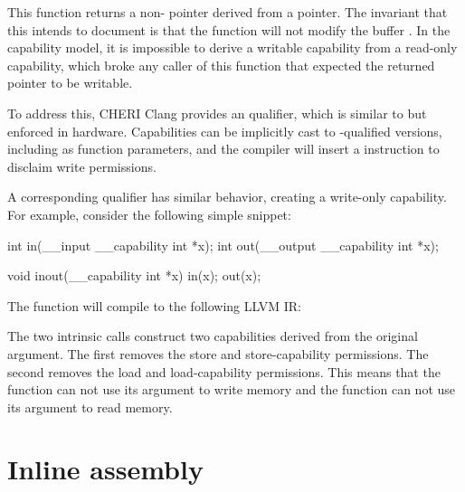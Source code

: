 This function returns a non- pointer derived from a  pointer.
The invariant that this intends to document is that the  function will not modify the buffer .
In the capability model, it is impossible to derive a writable capability from a read-only capability, which broke any caller of this function that expected the returned pointer to be writable.

To address this, CHERI Clang provides an  qualifier, which is similar to  but enforced in hardware.
Capabilities can be implicitly cast to -qualified versions, including as function parameters, and the compiler will insert a  instruction to disclaim write permissions.

A corresponding  qualifier has similar behavior, creating a write-only capability.
For example, consider the following simple snippet:

\begin{csnippet}
int in(__input __capability int *x);
int out(__output __capability int *x);

void inout(__capability int *x)
{
	in(x);
	out(x);
}
\end{csnippet}

The  function will compile to the following LLVM IR:


The two intrinsic calls construct two capabilities derived from the original argument.
The first removes the store and store-capability permissions.
The second removes the load and load-capability permissions.
This means that the  function can not use its argument to write memory and the  function can not use its argument to read memory.

\section{Inline assembly}

